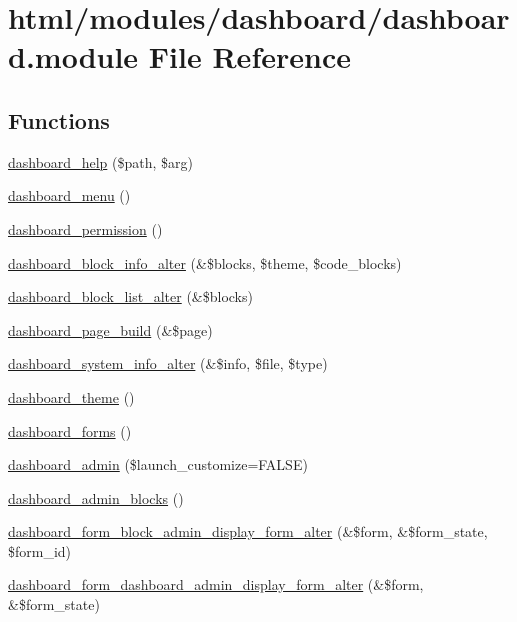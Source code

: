 \hypertarget{dashboard_8module}{
\section{html/modules/dashboard/dashboard.module File Reference}
\label{dashboard_8module}
}
\subsection*{Functions}
\begin{DoxyCompactItemize}
\item 
\hyperlink{dashboard_8module_a5156a3b29dbbd20299db17270ca1376f}{dashboard\_\-help} (\$path, \$arg)
\item 
\hyperlink{dashboard_8module_a68af4d617d1fce11a414953a1f78f80b}{dashboard\_\-menu} ()
\item 
\hyperlink{dashboard_8module_ae4348345274280e037d81be3211df773}{dashboard\_\-permission} ()
\item 
\hyperlink{dashboard_8module_a3078195deddafd6b6054bf7f3928207a}{dashboard\_\-block\_\-info\_\-alter} (\&\$blocks, \$theme, \$code\_\-blocks)
\item 
\hyperlink{dashboard_8module_a8eb99c8e9edd83aab44177f65e1c78b1}{dashboard\_\-block\_\-list\_\-alter} (\&\$blocks)
\item 
\hyperlink{dashboard_8module_a2fb8f282cd5d5c75158550690d39dc5d}{dashboard\_\-page\_\-build} (\&\$page)
\item 
\hyperlink{dashboard_8module_aaa46ea0b9298c11e6e2f4113dd1e6037}{dashboard\_\-system\_\-info\_\-alter} (\&\$info, \$file, \$type)
\item 
\hyperlink{dashboard_8module_a5eb2465436208886f8f72abfb1c7a540}{dashboard\_\-theme} ()
\item 
\hyperlink{dashboard_8module_ac9d916ce89f60f399c96ace265743115}{dashboard\_\-forms} ()
\item 
\hyperlink{dashboard_8module_ac7e281708902d92b286b4f5d31d3edad}{dashboard\_\-admin} (\$launch\_\-customize=FALSE)
\item 
\hyperlink{dashboard_8module_a65f41fb117c7c340bcea3b03d8a03086}{dashboard\_\-admin\_\-blocks} ()
\item 
\hyperlink{dashboard_8module_a27b951de6a5c0b090a3415492c9e15c7}{dashboard\_\-form\_\-block\_\-admin\_\-display\_\-form\_\-alter} (\&\$form, \&\$form\_\-state, \$form\_\-id)
\item 
\hyperlink{dashboard_8module_a51045bc5f407b9e76a6dfb9b182bad12}{dashboard\_\-form\_\-dashboard\_\-admin\_\-display\_\-form\_\-alter} (\&\$form, \&\$form\_\-state)

\end{DoxyCompactItemize}
